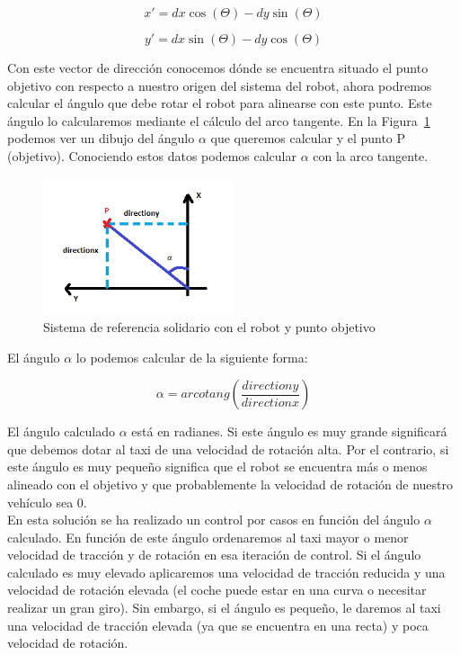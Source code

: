 \begin{equation} 
x' = dx \cos(\Theta) - dy \sin(\Theta)
\end{equation}

\begin{equation} 
y' = dx \sin(\Theta) - dy \cos(\Theta)
\end{equation}


Con este vector de dirección conocemos dónde se encuentra situado el punto objetivo con respecto a nuestro origen del sistema del robot, ahora podremos calcular el ángulo que debe rotar el robot para alinearse con este punto. Este ángulo lo calcularemos mediante el cálculo del arco tangente. En la Figura~\ref{fig.Triangulo_gpp} podemos ver un dibujo del ángulo \(\alpha\) que queremos calcular y el punto P (objetivo). Conociendo estos datos podemos calcular \(\alpha\) con la arco tangente.

\begin{figure}[H]
  \begin{center}
    \includegraphics[width=0.5\textwidth]{figures/GPP/Triangulo.png}
		\caption{Sistema de referencia solidario con el robot y punto objetivo}
		\label{fig.Triangulo_gpp}
		\end{center}
\end{figure}

El ángulo \(\alpha\) lo podemos calcular de la siguiente forma:

\begin{equation} 
\alpha = arcotang\left(\frac{directiony}{directionx}\right)
\end{equation}

El ángulo calculado \(\alpha\) está en radianes. Si este ángulo es muy grande significará que debemos dotar al taxi de una velocidad de rotación alta. Por el contrario, si este ángulo es muy pequeño significa que el robot se encuentra más o menos alineado con el objetivo y que probablemente la velocidad de rotación de nuestro vehículo sea 0.\\

En esta solución se ha realizado un control por casos en función del ángulo \(\alpha\)  calculado. En función de este ángulo ordenaremos al taxi mayor o menor velocidad de tracción y de rotación en esa iteración de control. Si el ángulo calculado es muy elevado aplicaremos una velocidad de tracción reducida y una velocidad de rotación elevada (el coche puede estar en una curva o necesitar realizar un gran giro). Sin embargo, si el ángulo es pequeño, le daremos al taxi una velocidad de tracción elevada (ya que se encuentra en una recta) y poca velocidad de rotación.\\

